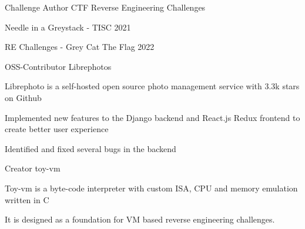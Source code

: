 

\begin{cventries}

  \cventry
    {Challenge Author}
    {CTF Reverse Engineering Challenges}
    {} %
    {} %
    {
        \begin{cvitems}
            \item {Needle in a Greystack - TISC 2021}
            \item {RE Challenges - Grey Cat The Flag 2022}
        \end{cvitems}
    }
  \cventry
    {OSS-Contributor} %
    {Librephotos} %
    {} %
    {} %
    {
        \begin{cvitems}
          \item {Librephoto is a self-hosted open source photo management service with 3.3k stars on Github}
          \item {Implemented new features to the Django backend and React.js Redux frontend to create better user experience}
          \item {Identified and fixed several bugs in the backend}
        \end{cvitems}
    }

  \cventry
    {Creator} %
    {toy-vm} %
    {} %
    {} %
    {
        \begin{cvitems}
          \item {Toy-vm is a byte-code interpreter with custom ISA, CPU and memory emulation written in C}
          \item {It is designed as a foundation for VM based reverse engineering challenges.}
        \end{cvitems}
    }


\end{cventries}
